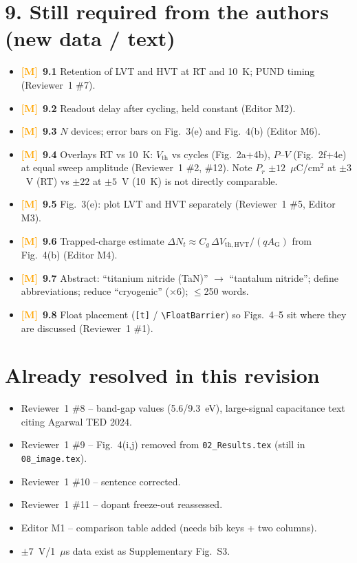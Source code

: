 \documentclass[10pt,a4paper]{article}
\newcommand{\M}{\textcolor{orange}{\textbf{[M]}}}
\begin{document}
\section*{9. Still required from the authors (new data / text)}
\begin{itemize}
\item \M\ \textbf{9.1} Retention of LVT and HVT at RT and 10~K; PUND timing (Reviewer~1 \#7).
\item \M\ \textbf{9.2} Readout delay after cycling, held constant (Editor M2).
\item \M\ \textbf{9.3} $N$ devices; error bars on Fig.~3(e) and Fig.~4(b) (Editor M6).
\item \M\ \textbf{9.4} Overlays RT vs 10~K: $V_{\mathrm{th}}$ vs cycles (Fig.~2a+4b), $P$--$V$ (Fig.~2f+4e) at equal sweep amplitude (Reviewer~1 \#2, \#12). Note $P_r$ $\pm12$~$\mu$C/cm$^2$ at $\pm3$~V (RT) vs $\pm22$ at $\pm5$~V (10~K) is not directly comparable.
\item \M\ \textbf{9.5} Fig.~3(e): plot LVT and HVT separately (Reviewer~1 \#5, Editor M3).
\item \M\ \textbf{9.6} Trapped-charge estimate $\Delta N_t \approx C_g\,\Delta V_{\mathrm{th,HVT}}/(qA_{\mathrm G})$ from Fig.~4(b) (Editor M4).
\item \M\ \textbf{9.7} Abstract: ``titanium nitride (TaN)'' $\rightarrow$ ``tantalum nitride''; define abbreviations; reduce ``cryogenic'' ($\times$6); $\le$250 words.
\item \M\ \textbf{9.8} Float placement (\texttt{[t]} / \verb|\FloatBarrier|) so Figs.~4--5 sit where they are discussed (Reviewer~1 \#1).
\end{itemize}

\section*{Already resolved in this revision}
\begin{itemize}
\item Reviewer~1 \#8 -- band-gap values (5.6/9.3~eV), large-signal capacitance text citing Agarwal TED 2024.
\item Reviewer~1 \#9 -- Fig.~4(i,j) removed from \texttt{02\_Results.tex} (still in \texttt{08\_image.tex}).
\item Reviewer~1 \#10 -- sentence corrected.
\item Reviewer~1 \#11 -- dopant freeze-out reassessed.
\item Editor M1 -- comparison table added (needs bib keys + two columns).
\item $\pm7$~V/1~$\mu$s data exist as Supplementary Fig.~S3.
\end{itemize}
\end{document}
